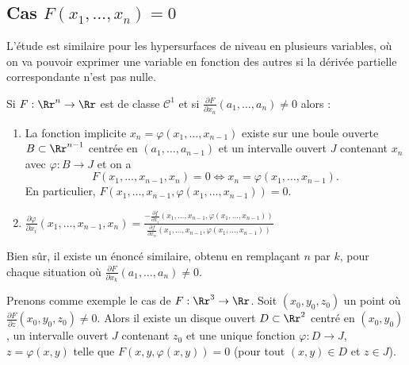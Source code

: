 \documentclass[11pt, class=report,crop=false]{standalone}
\begin{document}
\subsection{Cas $F(x_1,\ldots,x_n) = 0$}

L'étude est similaire pour les hypersurfaces de niveau en plusieurs variables, où on va pouvoir exprimer une variable en fonction des autres si la dérivée partielle correspondante n'est pas nulle. 

\begin{theoreme}
Si $F : \Rr^n\to \Rr$ est de classe $\mathcal{C}^1$ et si $\displaystyle \frac{\partial F}{\partial x_{n}}  (a_1,\ldots,a_n) \neq 0$ alors : 
\begin{enumerate}
    \item  La fonction implicite $x_n = \varphi (x_1, \ldots, x_{n-1})$ existe sur une boule ouverte $B \subset \Rr^{n-1}$ centrée en $(a_1, \ldots,  a_{n-1})$  et un intervalle ouvert $J$ contenant $x_n$ avec $\varphi : B \to J$ et on a 
$$F(x_1,\ldots,x_{n-1},x_n)=0 \iff x_{n} = \varphi (x_{1},   \ldots,  x_{n-1}).$$
En particulier, $F(x_{1}, \ldots, x_{n-1}, \varphi(x_{1}, \ldots, x_{n-1})) = 0$.

    \item $\displaystyle \frac{\partial \varphi}{\partial x_{i}} (x_1,\ldots,x_{n-1},x_n)
     =  \frac{- \frac{\partial f}{\partial x_{i}} (x_{1},  \ldots,  x_{n-1} , \varphi(x_{1},  \ldots,  x_{n-1}))}{\frac{\partial f}{\partial x_{n}} (x_{1},  \ldots,  x_{n-1} , \varphi(x_{1},  \ldots,  x_{n-1}))}$
\end{enumerate}
\end{theoreme}

Bien sûr, il existe un énoncé similaire, obtenu en remplaçant $n$ par $k$, pour chaque situation où $\displaystyle \frac{\partial F}{\partial x_{k}}  (a_1,\ldots,a_n) \neq 0$.

Prenons comme exemple le cas de $F : \Rr^3 \to \Rr$.
Soit $(x_0,y_0,z_0)$ un point où $\frac{\partial F}{\partial z} (x_0,y_0,z_0)  \neq 0$.
Alors il existe un disque ouvert $D \subset \Rr^2$ centré en $(x_0,y_0)$, un intervalle ouvert $J$ contenant $z_0$ et une unique fonction $\varphi : D \to J$,  $z=\varphi(x,y)$ telle que $F(x,y, \varphi(x,y)) = 0$ (pour tout $(x,y)\in D$ et $z\in J$).
 
\end{document}
